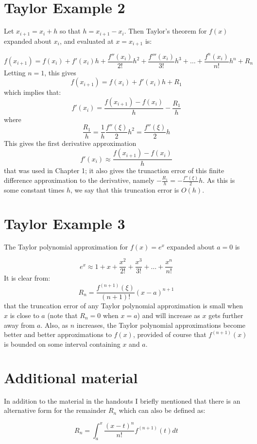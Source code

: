 \documentclass [titlepage,12pt,letter] {article}
\begin{document}
\section{Taylor Example 2} 
Let $x_{i+1} = x_{i} + h$ so that $h = x_{i+1} - x_{i}$. Then Taylor's theorem for $f(x)$ expanded about $x_{i}$, and evaluated at $x=x_{i+1}$ is: 

\[ 
f(x_{i+1}) = f(x_i) + f'(x_i) h + \frac{f''(x_i)}{2!}h^2 + \frac{f'''(x_i)}{3!}h^3 + \dots + \frac{f^{n}(x_i)}{n!}h^n + R_{n}  
\] 
\noindent 
Letting $n=1$, this gives 
\[
f(x_{i+1}) = f(x_i) + f'(x_i) h + R_1
\]
\noindent 
which implies that: 
\[
f'(x_i)  = \frac{f(x_{i+1})-f(x_i)}{h}-\frac{R_1}{h} 
\]
\noindent 
where
\[
\frac{R_1}{h} = \frac{1}{h}\frac{f''(\xi)}{2} h^2 = \frac{f''(\xi)}{2} h
\]
\noindent
This gives the first derivative approximation
\[
f'(x_i) \approx \frac{f(x_{i+1})-f(x_i)}{h}
\] 
\noindent 
that was used in Chapter 1; it also gives the trunaction error of this finite difference approximation to the derivative, namely $-\frac{R_1}{h} = -\frac{f''(\xi)}{2}h$. As this is some constant times $h$, we say that this truncation error is $O(h)$. 


\section{Taylor Example 3} 

The Taylor polynomial approximation for $f(x) = e^x$ expanded about $a=0$ is 

\[ 
e^x \approx 1 + x + \frac{x^2}{2!} + \frac{x^3}{3!} + \dots + \frac{x^n}{n!} 
\]
\noindent 
It is clear from: 
\[
R_n = \frac{f^{(n+1)} (\xi)}{(n+1)!}(x-a)^{n+1} 
\]
\noindent 
that the truncation error of any Taylor polynomial approximation is small when $x$ is close to $a$ (note that $R_n=0$ when $x=a$) and will increase as $x$ gets further away from $a$. Also, as $n$ increases, the Taylor polynomial approximations become better and better approximations to $f(x)$, provided of course that $f^{(n+1)}(x)$ is bounded on some interval containing $x$ and $a$. 

\section{Additional material}
In addition to the material in the handouts I briefly mentioned that 
there is an alternative form for the remainder $R_n$ which can also be
defined as: 

\begin{equation} 
R_n = \int^{x}_{a} \frac{(x-t)^n}{n!} f^{(n+1)}(t)dt 
\end{equation} 
\end{document}
